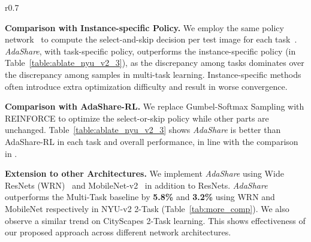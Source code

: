 \begin{wraptable}{r}{0.7\linewidth}{
\caption{\small{\textbf{Different Network Architectures on NYU v2 2-Task Learning.} $\mathcal{T}_1$: Semantic Segmentation, $\mathcal{T}_2$: Surface Normal Prediction.}}
\label{tab:more_comp}
}
\end{wraptable}
 
\textbf{Comparison with Instance-specific Policy.} We employ the same policy network~\cite{ahn2019deep} to compute the select-and-skip decision per test image for each task~\cite{veit2018convolutional,wu2018blockdrop}. \textit{AdaShare}, with task-specific policy, outperforms the instance-specific policy (in Table~\ref{table:ablate_nyu_v2_3}), as the discrepancy among tasks dominates over the discrepancy among samples in multi-task learning. Instance-specific methods often introduce extra optimization difficulty and result in worse convergence. 

\textbf{Comparison with AdaShare-RL.} We replace Gumbel-Softmax Sampling with REINFORCE to optimize the select-or-skip policy while other parts are unchanged. Table~\ref{table:ablate_nyu_v2_3} shows \textit{AdaShare} is better than AdaShare-RL in each task and overall performance, in line with the comparison in \cite{wu2019liteeval}.

\textbf{Extension to other Architectures.}  We implement \textit{AdaShare} using Wide ResNets (WRN)~\cite{zagoruyko2016wide} and MobileNet-v2~\cite{sandler2018mobilenetv2} in addition to ResNets. \textit{AdaShare} outperforms the Multi-Task baseline by \textbf{5.8\%} and \textbf{3.2\%} using WRN and MobileNet respectively in NYU-v2 2-Task (Table~\ref{tab:more_comp}). We also observe a similar trend on CityScapes 2-Task learning. This shows effectiveness of our proposed approach across different network architectures.  

